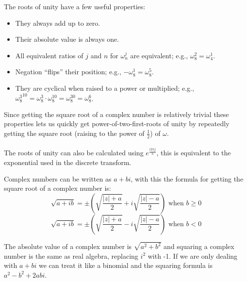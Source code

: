 \documentclass{beamer}
\begin{document}
\begin{frame}
  The roots of unity have a few useful properties:
  \begin{itemize}
    \item They always add up to zero.
    \item Their absolute value is always one.
    \item All equivalent ratios of $j$ and $n$ for $\omega_n^j$ are equivalent; e.g., $\omega_8^2 = \omega_4^1$.
    \item Negation ``flips'' their position; e.g., $-\omega_8^1 = \omega_8^5$.
    \item They are cyclical when raised to a power or multiplied; e.g., ${\omega_8^3}^{10} = \omega_8^3 \cdot \omega_8^{10} = \omega_8^{30} = \omega_8^6$.
  \end{itemize}
  Since getting the square root of a complex number is relatively trivial these properties lets us quickly get power-of-two-first-roots of unity by repeatedly getting the square root (raising to the power of $\frac{1}{2}$) of $\omega$.\\~\\
  The roots of unity can also be calculated using $e^\frac{i2\pi j}{n}$, this is equivalent to the exponential used in the discrete transform.
\end{frame}

\begin{frame}
  Complex numbers can be written as $a + bi$, with this the formula for getting the square root of a complex number is:
  \begin{displaymath}
    \sqrt{a+ib} = \pm\left(\sqrt{\frac{|z| + a}{2}} + i\sqrt{\frac{|z| - a}{2}}\right) \text{ when } b \ge 0
  \end{displaymath}
  \begin{displaymath}
    \sqrt{a+ib} = \pm\left(\sqrt{\frac{|z| + a}{2}} - i\sqrt{\frac{|z| - a}{2}}\right) \text{ when } b < 0
  \end{displaymath}

  The absolute value of a complex number is $\sqrt{a^2+b^2}$ and squaring a complex number is the same as real algebra, replacing $i^2$ with -1. If we are only dealing with $a + bi$ we can treat it like a binomial and the squaring formula is $a^2 - b^2 + 2abi$.
\end{frame}
\end{document}
